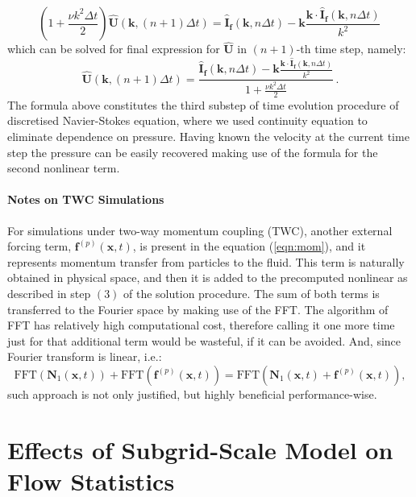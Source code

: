 \documentclass{pracamgren}
\begin{document}
\begin{enumerate}
$$ \left( 1 + \frac{\nu k^2 \Delta t}{2} \right) \mathbf{\hat{U}}(\mathbf{k}, (n+1) \Delta t) = \mathbf{\hat{I}_f}(\mathbf{k}, n \Delta t) - \mathbf{k} \frac{\mathbf{k} \cdot \mathbf{\hat{I}_f}(\mathbf{k}, n \Delta t)}{k^2} \, $$
which can be solved for final expression for $\mathbf{\hat{U}}$ in $(n+1)$-th time step, namely:
\begin{equation}
\mathbf{\hat{U}}(\mathbf{k}, (n+1) \Delta t) = \frac{\mathbf{\hat{I}_f}(\mathbf{k}, n \Delta t) - \mathbf{k} \frac{\mathbf{k} \cdot \mathbf{\hat{I}_f}(\mathbf{k}, n \Delta t)}{k^2}}{1 + \frac{\nu k^2 \Delta t}{2}} \, .
\end{equation}
The formula above constitutes the third substep of time evolution procedure of discretised Navier-Stokes equation, where we used continuity equation to eliminate dependence on pressure.
Having known the velocity at the current time step the pressure can be easily recovered making use of the formula for the second nonlinear term.
\end{enumerate}

\subsubsection{Notes on TWC Simulations}

For simulations under two-way momentum coupling (TWC), another external forcing term, $\mathbf{f}^{(p)}(\mathbf{x},t)$, is present in the equation (\ref{eqn:mom}), and it represents momentum transfer from particles to the fluid.
This term is naturally obtained in physical space, and then it is added to the precomputed nonlinear as described in step $(3)$ of the solution procedure.
The sum of both terms is transferred to the Fourier space by making use of the FFT.
The algorithm of FFT has relatively high computational cost, therefore calling it one more time just for that additional term would be wasteful, if it can be avoided.
And, since Fourier transform is linear, i.e.:
$$\text{FFT}(\textbf{N}_1 (\mathbf{x},t)) + \text{FFT}(\textbf{f}^{(p)} (\mathbf{x},t)) = \text{FFT}(\textbf{N}_1 (\mathbf{x},t) +  \textbf{f}^{(p)} (\mathbf{x},t)), $$
such approach is not only justified, but highly beneficial performance-wise.




\chapter{Effects of Subgrid-Scale Model on Flow Statistics}
\label{app:sgs}
\end{document}
